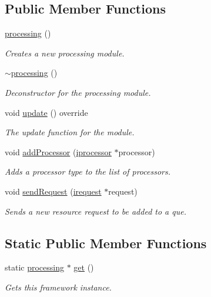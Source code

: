\subsection*{Public Member Functions}
\begin{DoxyCompactItemize}
\item 
\hyperlink{classflounder_1_1processing_a1e1e4e71f153a05c6ff7eeef4c745500}{processing} ()
\begin{DoxyCompactList}\small\item\em Creates a new processing module. \end{DoxyCompactList}\item 
\hyperlink{classflounder_1_1processing_ad36e9f1f3ba3ae1cbf101333c03fd0c7}{$\sim$processing} ()
\begin{DoxyCompactList}\small\item\em Deconstructor for the processing module. \end{DoxyCompactList}\item 
void \hyperlink{classflounder_1_1processing_ac096299eb1b5b67739586900710d4206}{update} () override
\begin{DoxyCompactList}\small\item\em The update function for the module. \end{DoxyCompactList}\item 
void \hyperlink{classflounder_1_1processing_a9ae5080b9ed1099aae8db7db034c9eee}{add\+Processor} (\hyperlink{classflounder_1_1iprocessor}{iprocessor} $\ast$processor)
\begin{DoxyCompactList}\small\item\em Adds a processor type to the list of processors. \end{DoxyCompactList}\item 
void \hyperlink{classflounder_1_1processing_addb84aad44d50ae3fa9513cddcea9968}{send\+Request} (\hyperlink{classflounder_1_1irequest}{irequest} $\ast$request)
\begin{DoxyCompactList}\small\item\em Sends a new resource request to be added to a que. \end{DoxyCompactList}\end{DoxyCompactItemize}
\subsection*{Static Public Member Functions}
\begin{DoxyCompactItemize}
\item 
static \hyperlink{classflounder_1_1processing}{processing} $\ast$ \hyperlink{classflounder_1_1processing_a9d533a541a2a514d201ff2c37782d44d}{get} ()
\begin{DoxyCompactList}\small\item\em Gets this framework instance. \end{DoxyCompactList}\end{DoxyCompactItemize}
